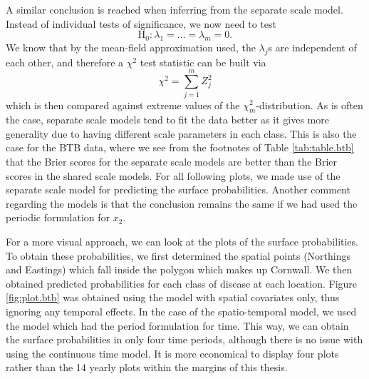 \documentclass[a4paper,showframe,11pt]{report}\usepackage[]{graphicx}\usepackage[]{color}
\begin{document}
A similar conclusion is reached when inferring from the separate scale model. Instead of individual tests of significance, we now need to test
\[
  \text{H}_0: \lambda_1 = \dots = \lambda_m = 0.
\]
We know that by the mean-field approximation used, the $\lambda_j$s are independent of each other, and therefore a $\chi^2$ test statistic can be built via
\[
  \chi^2 = \sum_{j=1}^m Z_j^2
\]
which is then compared against extreme values of the $\chi^2_m$-distribution.
As is often the case, separate scale models tend to fit the data better as it gives more generality due to having different scale parameters in each class.
This is also the case for the BTB data, where we see from the footnotes of Table \ref{tab:table.btb} that the Brier scores for the separate scale models are better than the Brier scores in the shared scale models.
For all following plots, we made use of the separate scale model for predicting the surface probabilities.
Another comment regarding the models is that the conclusion remains the same if we had used the periodic formulation for $x_2$.

For a more visual approach, we can look at the plots of the surface probabilities.
To obtain these probabilities, we first determined the spatial points (Northings and Eastings) which fall inside the polygon which makes up Cornwall.
We then obtained predicted probabilities for each class of disease at each location.
Figure \ref{fig:plot.btb} was obtained using the model with spatial covariates only, thus ignoring any temporal effects.
In the case of the spatio-temporal model, we used the model which had the period formulation for time.
This way, we can obtain the surface probabilities in only four time periods, although there is no issue with using the continuous time model.
It is more economical to display four plots rather than the 14 yearly plots within the margins of this thesis.
\end{document}
